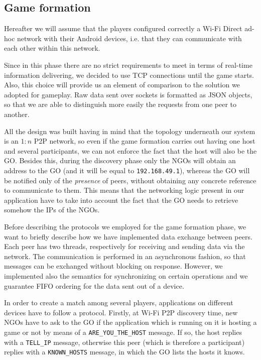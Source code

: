 \subsection{Game formation}

Hereafter we will assume that the players configured correctly a Wi-Fi Direct
ad-hoc network with their Android devices, i.e. that they can communicate with
each other within this network.

Since in this phase there are no strict requirements to meet in terms of
real-time information delivering, we decided to use TCP connections until the
game starts. Also, this choice will provide us an element of comparison to the
solution we adopted for gameplay.
Raw data sent over sockets is formatted as JSON objects, so that we are able to
distinguish more easily the requests from one peer to another.

All the design was built having in mind that the topology underneath our system
is an $1:n$ P2P network, so even if the game formation carries out having one
host and several participants, we can not enforce the fact that the host will
also be the GO. Besides this, during the discovery phase only the NGOs will
obtain an address to the GO (and it will be equal to \texttt{192.168.49.1}),
whereas the GO will be notified only of the \textit{presence} of peers, without
obtaining any concrete reference to communicate to them. This means that the
networking logic present in our application have to take into account the fact
that the GO needs to retrieve somehow the IPs of the NGOs.

Before describing the protocols we employed for the game formation phase, we
want to briefly describe how we have implemented data exchange between peers.
Each peer has two threads, respectively for receiving and sending data via the
network. The communication is performed in an asynchronous fashion, so that
messages can be exchanged without blocking on response. However, we implemented
also the semantics for synchronizing on certain operations and we guarantee FIFO
ordering for the data sent out of a device.

In order to create a match among several players, applications on different
devices have to follow a protocol. Firstly, at Wi-Fi P2P discovery time, new
NGOs have to ask to the GO if the application which is running on it is hosting
a game or not by means of a \texttt{ARE\_YOU\_THE\_HOST} message. If so, the
host replies with a \texttt{TELL\_IP} message, otherwise this peer (which is
therefore a participant) replies with a \texttt{KNOWN\_HOSTS} message, in which
the GO lists the hosts it knows.

